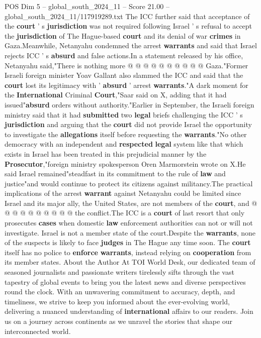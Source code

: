 \begin{textsample}{POS Dim 5 – global\_south\_2024\_11 – Score 21.00 – global\_south\_2024\_11/117919289.txt}
The ICC further said that acceptance of the \textbf{court} ' s \textbf{jurisdiction} was not required following Israel ' s refusal to accept the \textbf{jurisdiction} of The Hague-based \textbf{court} and its denial of war \textbf{crimes} in Gaza.Meanwhile, Netanyahu condemned the arrest \textbf{warrants} and said that Israel rejects ICC ' s \textbf{absurd} and false actions.In a statement released by his office, Netanyahu said,"There is nothing more @ @ @ @ @ @ @ @ @ @ Gaza."Former Israeli foreign minister Yoav Gallant also slammed the ICC and said that the \textbf{court} lost its legitimacy with ' \textbf{absurd} ' arrest \textbf{warrants}."A dark moment for the \textbf{International} Criminal \textbf{Court},"Saar said on X, adding that it had issued"\textbf{absurd} orders without authority."Earlier in September, the Israeli foreign ministry said that it had \textbf{submitted} two \textbf{legal} briefs challenging the ICC ' s \textbf{jurisdiction} and arguing that the \textbf{court} did not provide Israel the opportunity to investigate the \textbf{allegations} itself before requesting the \textbf{warrants}."No other democracy with an independent and \textbf{respected} \textbf{legal} system like that which exists in Israel has been treated in this prejudicial manner by the \textbf{Prosecutor},"foreign ministry spokesperson Oren Marmorstein wrote on X.He said Israel remained"steadfast in its commitment to the rule of \textbf{law} and justice"and would continue to protect its citizens against militancy.The practical implications of the arrest \textbf{warrant} against Netanyahu could be limited since Israel and its major ally, the United States, are not members of the \textbf{court}, and @ @ @ @ @ @ @ @ @ @ the conflict.The ICC is a \textbf{court} of last resort that only prosecutes \textbf{cases} when domestic \textbf{law} enforcement authorities can not or will not investigate.
Israel is not a member state of the court.Despite the \textbf{warrants}, none of the suspects is likely to face \textbf{judges} in The Hague any time soon.
The \textbf{court} itself has no police to \textbf{enforce} \textbf{warrants}, instead relying on \textbf{cooperation} from its member states.
About the Author At TOI World Desk, our dedicated team of seasoned journalists and passionate writers tirelessly sifts through the vast tapestry of global events to bring you the latest news and diverse perspectives round the clock.
With an unwavering commitment to accuracy, depth, and timeliness, we strive to keep you informed about the ever-evolving world, delivering a nuanced understanding of \textbf{international} affairs to our readers.
Join us on a journey across continents as we unravel the stories that shape our interconnected world.

\end{textsample}

